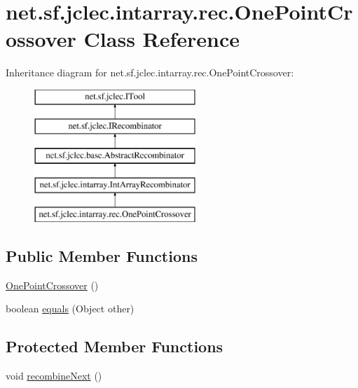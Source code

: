 \hypertarget{classnet_1_1sf_1_1jclec_1_1intarray_1_1rec_1_1_one_point_crossover}{\section{net.\-sf.\-jclec.\-intarray.\-rec.\-One\-Point\-Crossover Class Reference}
\label{classnet_1_1sf_1_1jclec_1_1intarray_1_1rec_1_1_one_point_crossover}
}
Inheritance diagram for net.\-sf.\-jclec.\-intarray.\-rec.\-One\-Point\-Crossover\-:\begin{figure}[H]
\begin{center}
\leavevmode
\includegraphics[height=5.000000cm]{classnet_1_1sf_1_1jclec_1_1intarray_1_1rec_1_1_one_point_crossover}
\end{center}
\end{figure}
\subsection*{Public Member Functions}
\begin{DoxyCompactItemize}
\item 
\hyperlink{classnet_1_1sf_1_1jclec_1_1intarray_1_1rec_1_1_one_point_crossover_acc7638ec237a6c0a3b68163a793882ca}{One\-Point\-Crossover} ()
\item 
boolean \hyperlink{classnet_1_1sf_1_1jclec_1_1intarray_1_1rec_1_1_one_point_crossover_a8581a048f37d0ff359a871fe6cea263a}{equals} (Object other)
\end{DoxyCompactItemize}
\subsection*{Protected Member Functions}
\begin{DoxyCompactItemize}
\item 
void \hyperlink{classnet_1_1sf_1_1jclec_1_1intarray_1_1rec_1_1_one_point_crossover_a1fb4e33b91c4392c0d9a791565f4e500}{recombine\-Next} ()
\end{DoxyCompactItemize}
